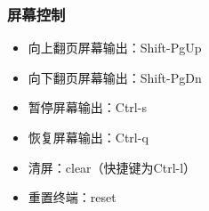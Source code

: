 \documentclass[xcolor=svgnames,presentation]{beamer}
\begin{document}
\begin{frame}
\frametitle{屏幕控制}
\label{sec-4-3-8}
\begin{itemize}

\item 向上翻页屏幕输出：Shift-PgUp
\label{sec-4-3-8-1}%

\item 向下翻页屏幕输出：Shift-PgDn
\label{sec-4-3-8-2}%

\item 暂停屏幕输出：Ctrl-s
\label{sec-4-3-8-3}%

\item 恢复屏幕输出：Ctrl-q
\label{sec-4-3-8-4}%

\item 清屏：clear（快捷键为Ctrl-l）
\label{sec-4-3-8-5}%

\item 重置终端：reset
\label{sec-4-3-8-6}%
\end{itemize} %
\end{frame}
\end{document}
